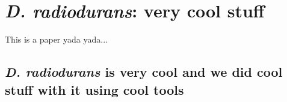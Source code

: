 \chapter{\textit{D. radiodurans}: very cool stuff}

This is a paper yada yada...

\section*{\textit{D. radiodurans} is very cool and we did cool stuff with it using cool tools}

\localtableofcontents
